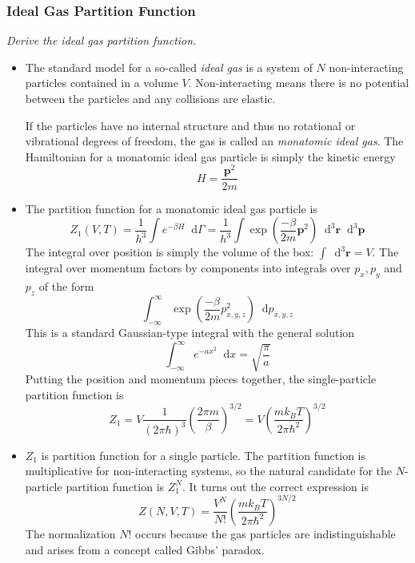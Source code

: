 \documentclass[11pt, a4paper]{article}
\newcommand{\diff}{\mathop{}\!\mathrm{d}} %
\begin{document}
\subsubsection{Ideal Gas Partition Function} \label{sss:ideal_gas_part_func}
\textit{Derive the ideal gas partition function.}
\begin{itemize}
	\item The standard model for a so-called \textit{ideal gas} is a system of $ N $ non-interacting particles contained in a volume $ V $. Non-interacting means there is no potential between the particles and any collisions are elastic. 
	
	If the particles have no internal structure and thus no rotational or vibrational degrees of freedom, the gas is called an \textit{monatomic ideal gas}. The Hamiltonian for a monatomic ideal gas particle is simply the kinetic energy
	\begin{equation*}
		H = \frac{\bm{p}^{2}}{2m}
	\end{equation*}
	
	\item The partition function for a monatomic ideal gas particle is
	\begin{equation*}
		Z_{1}(V, T) = \frac{1}{h^{3}} \int e^{-\beta H} \diff \Gamma = \frac{1}{h^{3}} \int \exp(\frac{- \beta }{2m}\bm{p}^{2}) \diff^{3}\bm{r}\diff^{3}\bm{p}
	\end{equation*}
	The integral over position is simply the volume of the box: $ \int \diff^{3}\bm{r} = V $. The integral over momentum factors by components into integrals over $ p_{x}, p_{y} $ and $ p_{z} $ of the form
	\begin{equation*}
		\int_{-\infty}^{\infty} \exp(\frac{- \beta }{2m}p_{x,y,z}^{2})\diff p_{x,y,z}
	\end{equation*}
	This is a standard Gaussian-type integral with the general solution
	\begin{equation*}
		\int_{-\infty}^{\infty} e^{-ax^{2}} \diff x = \sqrt{\frac{\pi}{a}}
	\end{equation*}
	Putting the position and momentum pieces together, the single-particle partition function is
	\begin{equation*}
		Z_{1} = V \frac{1}{(2\pi \hbar)^{3}} \left(\frac{2\pi m}{\beta}\right)^{3/2} = V \left(\frac{mk_{B}T}{2\pi \hbar^{2}}\right)^{3/2}
	\end{equation*}
	
	\item $ Z_{1} $ is partition function for a single particle. The partition function is multiplicative for non-interacting systems, so the natural candidate for the $ N $-particle partition function is $ Z_{1}^{N} $. It turns out the correct expression is
	\begin{equation*}
		Z(N, V, T) = \frac{V^{N}}{N!} \left(\frac{mk_{B}T}{2\pi \hbar^{2}}\right)^{3N/2}
	\end{equation*}
	The normalization $ N! $ occurs because the gas particles are indistinguishable and arises from a concept called Gibbs' paradox.
	


\end{itemize}
\end{document}
